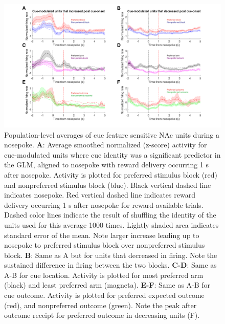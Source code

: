 \documentclass[11pt]{article}
\newcommand{\bsf}[1]{\textbf{#1}}
\begin{document}
\begin{figure}[h]
\centering
\includegraphics[width=\textwidth]{Fig 11 - NP population averages.png}
\caption{Population-level averages of cue feature sensitive NAc units during a
  nosepoke. \bsf{A}: Average smoothed normalized (z-score) activity for cue-modulated
  units where cue identity was a significant predictor in the GLM, aligned to
  nosepoke with reward delivery occurring 1 s after nosepoke. Activity is
  plotted for preferred stimulus block (red) and nonpreferred stimulus block
  (blue). Black vertical dashed line indicates nosepoke. Red vertical dashed line indicates reward
  delivery occurring 1 s after nosepoke for reward-available trials. Dashed color lines indicate the result of shuffling the identity of the units used for this average 1000 times. Lightly
  shaded area indicates standard error of the mean. Note larger increase leading
  up to nosepoke to preferred stimulus block over nonpreferred stimulus
  block. \bsf{B}: Same as A but for units that decreased in firing. Note the
  sustained difference in firing between the two blocks. \bsf{C-D}: Same as A-B
  for cue location. Activity is plotted for most preferred arm (black) and least preferred arm (magneta). \bsf{E-F}: Same as A-B for cue outcome. Activity is plotted for
  preferred expected outcome (red), and nonpreferred outcome (green). Note the
  peak after outcome receipt for preferred outcome in decreasing units (F).}
\label{fig:NP_pop}
\end{figure}
\end{document}
